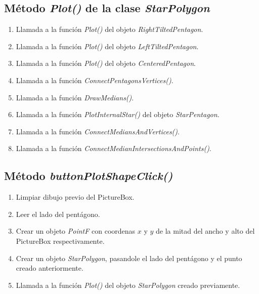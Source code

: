 \documentclass[oneside, a4paper]{article}
\begin{document}
        \subsection{Método \textit{Plot()} de la clase \textit{StarPolygon}}
            
            \begin{enumerate}
                \item Llamada a la función \textit{Plot()} del objeto \textit{RightTiltedPentagon}.
                \item Llamada a la función \textit{Plot()} del objeto \textit{LeftTiltedPentagon}.
                \item Llamada a la función \textit{Plot()} del objeto \textit{CenteredPentagon}.
                \item Llamada a la función \textit{ConnectPentagonsVertices()}.
                \item Llamada a la función \textit{DrawMedians()}.
                \item Llamada a la función \textit{PlotInternalStar()} del objeto \textit{StarPentagon}.
                \item Llamada a la función \textit{ConnectMediansAndVertices()}.
                \item Llamada a la función \textit{ConnectMedianIntersectionsAndPoints()}.
            \end{enumerate}

        \subsection{Método \textit{buttonPlotShapeClick()}}

            \begin{enumerate}
                \item Limpiar dibujo previo del PictureBox.
                \item Leer el lado del pentágono.
                \item Crear un objeto \textit{PointF} con coordenas $x$ y $y$ de la mitad del ancho y alto del PictureBox respectivamente.
                \item Crear un objeto \textit{StarPolygon}, pasandole el lado del pentágono y el punto creado anteriormente.
                \item Llamada a la función \textit{Plot()} del objeto \textit{StarPolygon} creado previamente.
            \end{enumerate}
\end{document}
